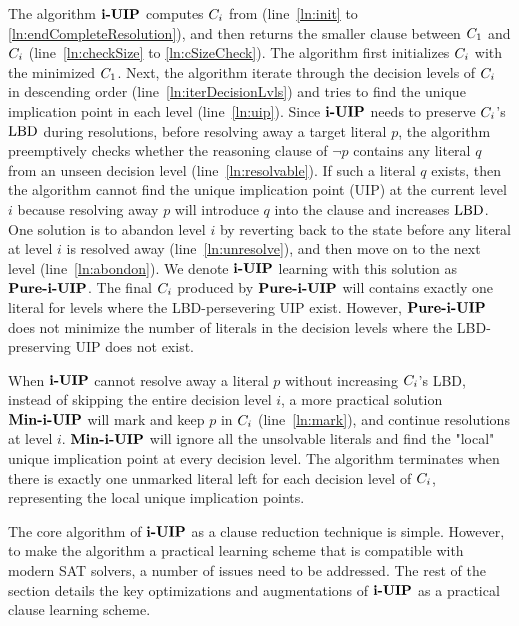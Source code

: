 The algorithm $\textbf{i-UIP}$ computes $C_{i}$ from (line~\ref{ln:init} to \ref{ln:endCompleteResolution}), and then returns the smaller clause between 
$C_{1}$ and $C_{i}$ (line~\ref{ln:checkSize} to \ref{ln:cSizeCheck}). 
The algorithm first initializes $C_{i}$ with the minimized\cite{} $C_{1}$. Next, the algorithm iterate through the decision levels of $C_{i}$ in descending order (line~\ref{ln:iterDecisionLvls}) and tries to find the unique implication point in each level (line~\ref{ln:uip}). Since $\textbf{i-UIP}$ needs to preserve $C_{i}$'s $\text{LBD}$ during resolutions, before resolving away a target literal $p$, the algorithm preemptively checks whether the reasoning clause of $\neg{p}$ contains any literal $q$ from an unseen decision level (line~\ref{ln:resolvable}). If such a literal $q$ exists, then the algorithm cannot find the unique implication point (UIP) at the current level $i$ because resolving away $p$ will introduce $q$ into the clause and increases $\text{LBD}$. One solution is to abandon level $i$ by reverting back to the state before any literal at level $i$ is resolved away (line~\ref{ln:unresolve}), and then move on to the next level (line~\ref{ln:abondon}). We denote $\textbf{i-UIP}$ learning with this solution as $\textbf{Pure-i-UIP}$. The final $C_{i}$ produced by $\textbf{Pure-i-UIP}$ will contains exactly one literal for levels where the LBD-persevering UIP exist. However, $\textbf{Pure-i-UIP}$ does not minimize the number of literals in the decision levels where the LBD-preserving UIP does not exist.

  When $\textbf{i-UIP}$ cannot resolve away a literal $p$ without increasing $C_{i}$'s LBD, instead of skipping the entire decision level $i$, a more practical solution $\textbf{Min-i-UIP}$ will mark and keep $p$ in $C_{i}$ (line~\ref{ln:mark}), and continue resolutions at level $i$. $\textbf{Min-i-UIP}$ will ignore all the unsolvable literals and find the "local" unique implication point at every decision level.  The algorithm terminates when there is exactly one unmarked literal left for each decision level of $C_{i}$, representing the local unique implication points. 

The core algorithm of $\textbf{i-UIP}$ as a clause reduction technique is simple. However, to make the algorithm a practical learning scheme that is compatible with modern SAT solvers, a number of issues need to be addressed. The rest of the section details the key optimizations and augmentations of $\textbf{i-UIP}$ as a practical clause learning scheme.

